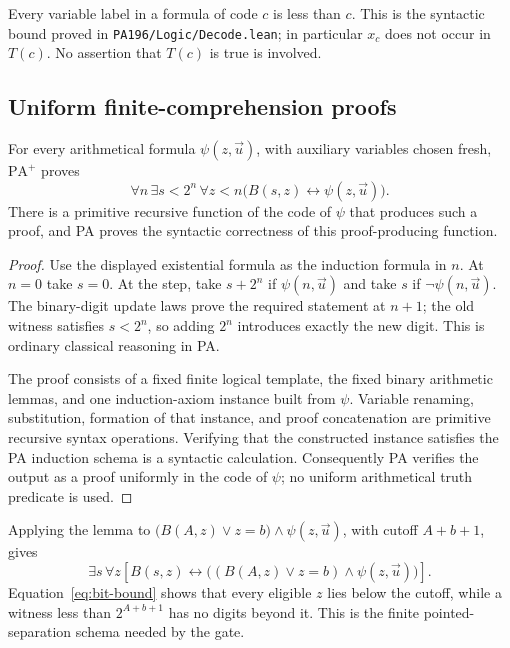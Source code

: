 Every variable label in a formula of code $c$ is less than $c$.
This is the syntactic bound proved in
\texttt{PA196/Logic/Decode.lean}; in particular $x_c$ does not occur
in $T(c)$.  No assertion that $T(c)$ is true is involved.

\subsection{Uniform finite-comprehension proofs}

\begin{lemma}
For every arithmetical formula $\psi(z,\vec u)$, with auxiliary variables
chosen fresh, $\mathrm{PA}^{+}$ proves
\begin{equation}\label{eq:finite-comprehension}
 \forall n\,\exists s<2^n\,
 \forall z<n\bigl(B(s,z)\leftrightarrow\psi(z,\vec u)\bigr).
\end{equation}
There is a primitive recursive function of the code of $\psi$ that
produces such a proof, and PA proves the syntactic correctness of
this proof-producing function.
\end{lemma}

\begin{proof}
Use the displayed existential formula as the induction formula in $n$.
At $n=0$ take $s=0$.  At the step, take $s+2^n$ if
$\psi(n,\vec u)$ and take $s$ if $\neg\psi(n,\vec u)$.
The binary-digit update laws prove the required statement at $n+1$;
the old witness satisfies $s<2^n$, so adding $2^n$ introduces exactly
the new digit.  This is ordinary classical reasoning in PA.

The proof consists of a fixed finite logical template, the fixed binary
arithmetic lemmas, and one induction-axiom instance built from $\psi$.
Variable renaming, substitution, formation of that instance, and proof
concatenation are primitive recursive syntax operations.  Verifying
that the constructed instance satisfies the PA induction schema is a
syntactic calculation.  Consequently PA verifies the output as a
proof uniformly in the code of $\psi$; no uniform arithmetical truth
predicate is used.
\end{proof}

Applying the lemma to
$\bigl(B(A,z)\lor z=b\bigr)\land\psi(z,\vec u)$,
with cutoff $A+b+1$, gives
\begin{equation}\label{eq:pointed-bits}
 \exists s\,\forall z\left[
 B(s,z)\leftrightarrow
 \bigl((B(A,z)\lor z=b)\land\psi(z,\vec u)\bigr)\right].
\end{equation}
Equation~\eqref{eq:bit-bound} shows that every eligible $z$ lies below
the cutoff, while a witness less than $2^{A+b+1}$ has no digits beyond
it.  This is the finite pointed-separation schema needed by the gate.

